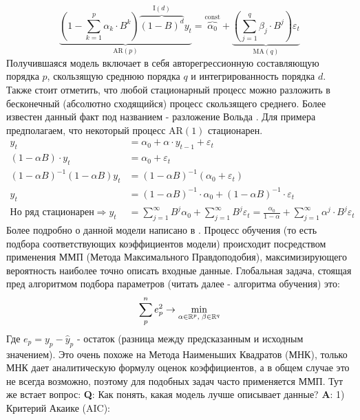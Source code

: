 	\begin{equation}
		\underbrace{\left(1 - \sum_{k = 1}^{p} \alpha_k \cdot B^k\right) \overbrace{(1 - B)^d}^{\text{I}(d)} y_t}_{\text{AR}(p)} = \overbrace{\alpha_0}^{\text{const}} + \underbrace{\left(\sum_{j = 1}^{q} \beta_j \cdot B^j\right) \varepsilon_{t}}_{\text{MA}(q)}
	\end{equation}
	Получившаяся модель включает в себя авторегрессионную составляющую порядка $p$, скользящую среднюю порядка $q$ и интегрированность порядка $d$. Также стоит отметить, что любой стационарный процесс можно разложить в бесконечный (абсолютно сходящийся) процесс скользящего среднего. Более известен данный факт под названием - разложение Вольда \cite{wold_decomposition}. Для примера предполагаем, что некоторый процесс AR$(1)$ стационарен.
	\begin{equation}
		\begin{split}
			y_t & = \alpha_ 0 + \alpha \cdot y_{t - 1} + \varepsilon_{t}\\
			(1 - \alpha B) \cdot y_t & = \alpha_0 + \varepsilon_{t}\\
			(1 - \alpha B)^{-1}(1 - \alpha B) y_t & = (1 - \alpha B)^{-1} (\alpha_0 + \varepsilon_{t})\\
			y_t & = (1 - \alpha B)^{-1} \cdot \alpha_0 + (1 - \alpha B)^{-1} \cdot \varepsilon_{t}\\
			\text{Но ряд стационарен} \Rightarrow y_t & = \sum_{j = 1}^{\infty} B^j\alpha_0 + \sum_{j = 1}^{\infty} B^j\varepsilon_{t} = \frac{\alpha_0}{1 - \alpha} + \sum_{j = 1}^{\infty} \alpha^j \cdot B^j\varepsilon_{t}
		\end{split}
	\end{equation}
	Более подробно о данной модели написано в \cite{arima}. Процесс обучения (то есть подбора соответствующих коэффициентов модели) происходит посредством применения ММП (Метода Максимального Правдоподобия), максимизирующего вероятность наиболее точно описать входные данные. Глобальная задача, стоящая пред алгоритмом подбора параметров (читать далее - алгоритма обучения) это:
	\begin{equation}
		\sum_{p}^n e_p^2 \to \min_{\alpha \in \mathbb{R}^p, \; \beta \in \mathbb{R}^q}
	\end{equation}
	Где $e_p = y_p - \hat{y}_p$ - остаток (разница между предсказанным и исходным значением). Это очень похоже на Метода Наименьших Квадратов (МНК), только МНК дает аналитическую формулу оценок коэффициентов, а в общем случае это не всегда возможно, поэтому для подобных задач часто применяется ММП. Тут же встает вопрос: \textbf{Q}: Как понять, какая модель лучше описывает данные? \textbf{A}: 1) Критерий Акаике (AIC):
